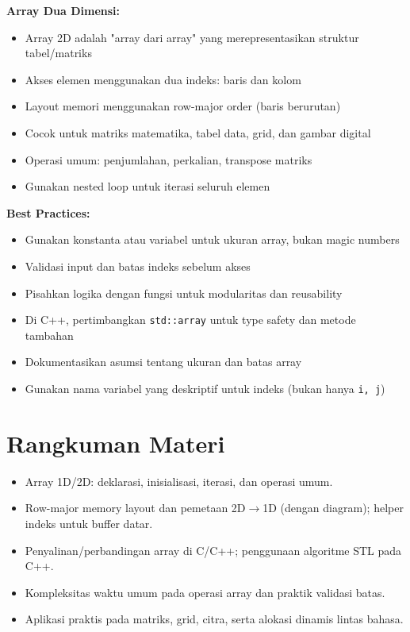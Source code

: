 \documentclass[../main.tex]{subfiles}
\begin{document}
\textbf{Array Dua Dimensi:}
\begin{itemize}
  \item Array 2D adalah "array dari array" yang merepresentasikan struktur tabel/matriks
  \item Akses elemen menggunakan dua indeks: baris dan kolom
  \item Layout memori menggunakan row-major order (baris berurutan)
  \item Cocok untuk matriks matematika, tabel data, grid, dan gambar digital
  \item Operasi umum: penjumlahan, perkalian, transpose matriks
  \item Gunakan nested loop untuk iterasi seluruh elemen
\end{itemize}

\textbf{Best Practices:}
\begin{itemize}
  \item Gunakan konstanta atau variabel untuk ukuran array, bukan magic numbers
  \item Validasi input dan batas indeks sebelum akses
  \item Pisahkan logika dengan fungsi untuk modularitas dan reusability
  \item Di C++, pertimbangkan \texttt{std::array} untuk type safety dan metode tambahan
  \item Dokumentasikan asumsi tentang ukuran dan batas array
  \item Gunakan nama variabel yang deskriptif untuk indeks (bukan hanya \texttt{i, j})
\end{itemize}

\section{Rangkuman Materi}
\begin{itemize}
  \item Array 1D/2D: deklarasi, inisialisasi, iterasi, dan operasi umum.
  \item Row-major memory layout dan pemetaan 2D\(\to\)1D (dengan diagram); helper indeks untuk buffer datar.
  \item Penyalinan/perbandingan array di C/C++; penggunaan algoritme STL pada C++.
  \item Kompleksitas waktu umum pada operasi array dan praktik validasi batas.
  \item Aplikasi praktis pada matriks, grid, citra, serta alokasi dinamis lintas bahasa.
\end{itemize}
\end{document}
